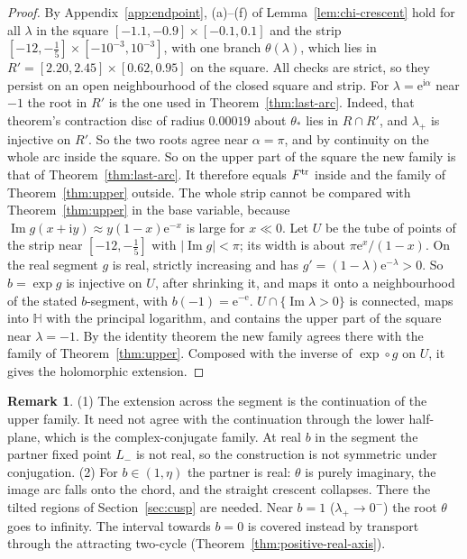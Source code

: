 \documentclass[11pt]{amsart}
\theoremstyle{definition}
\newtheorem{remark}[theorem]{Remark}
\newcommand{\eee}{\mathrm{e}}
\newcommand{\ii}{\mathrm{i}}
\begin{document}
\begin{proof}
By Appendix~\ref{app:endpoint}, (a)--(f) of Lemma~\ref{lem:chi-crescent} hold for all $\lambda$
in the square $[-1.1,-0.9]\times[-0.1,0.1]$ and the strip $[-12,-\tfrac15]\times[-10^{-3},10^{-3}]$,
with one branch $\theta(\lambda)$, which lies in $R'=[2.20,2.45]\times[0.62,0.95]$ on the square.
All checks are strict, so they persist on an open neighbourhood of the closed
square and strip.  For $\lambda=\eee^{\ii\alpha}$ near $-1$ the root in $R'$ is the one used in
Theorem~\ref{thm:last-arc}.  Indeed, that theorem's contraction disc of radius $0.00019$
about $\theta_*$ lies in $R\cap R'$, and $\lambda_+$ is injective on $R'$.  So the two roots agree near
$\alpha=\pi$, and by continuity on the whole arc inside the square.  So on the upper part of the
square the new family is that of Theorem~\ref{thm:last-arc}.  It therefore equals
$F^{\rm tr}$ inside and the family of Theorem~\ref{thm:upper} outside.  The whole strip cannot
be compared with Theorem~\ref{thm:upper} in the base variable, because
$\operatorname{Im}g(x+\ii y)\approx y(1-x)\eee^{-x}$ is large for $x\ll0$.  Let $U$ be the tube of points of the strip near $[-12,-\tfrac15]$ with
$|\operatorname{Im}g|<\pi$; its width is about $\pi\eee^{x}/(1-x)$.  On the real segment $g$ is real, strictly
increasing and has $g'=(1-\lambda)\eee^{-\lambda}>0$.  So $b=\exp g$ is injective on $U$, after shrinking it,
and maps it onto a neighbourhood of the stated $b$-segment, with $b(-1)=\eee^{-\eee}$.
$U\cap\{\operatorname{Im}\lambda>0\}$ is connected, maps into $\mathbb H$ with the principal logarithm, and contains
the upper part of the square near $\lambda=-1$.  By the identity theorem the new family
agrees there with the family of Theorem~\ref{thm:upper}.  Composed with the inverse of
$\exp\circ g$ on $U$, it gives the holomorphic extension.
\end{proof}

\begin{remark}\label{rem:endpoint}
(1) The extension across the segment is the continuation of the upper family.
It need not agree with the continuation through the lower half-plane, which is
the complex-conjugate family.  At real $b$ in the segment the partner fixed point
$L_-$ is not real, so the construction is not symmetric under conjugation.
(2) For $b\in(1,\eta)$ the partner is real: $\theta$ is purely imaginary, the image arc
falls onto the chord, and the straight crescent collapses.  There the tilted
regions of Section~\ref{sec:cusp} are needed.  Near $b=1$ ($\lambda_+\to0^-$) the root
$\theta$ goes to infinity.  The interval towards $b=0$ is covered instead
by transport through the attracting two-cycle (Theorem~\ref{thm:positive-real-axis}).
\end{remark}
\end{document}
